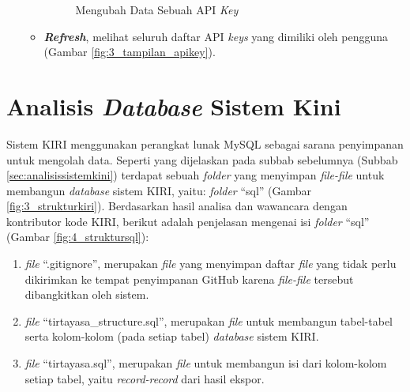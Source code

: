 \begin{enumerate}
\begin{itemize}
\begin{figure}[htbp]
			\caption{Mengubah Data Sebuah API \textit{Key}}
			\label{fig:3_tampilan_editapikey}
		\end{figure}
		\item \textbf{\textit{Refresh}}, melihat seluruh daftar API \textit{keys} yang dimiliki oleh pengguna (Gambar \ref{fig:3_tampilan_apikey}).
	\end{itemize}
	
\end{enumerate}


\section{Analisis \textit{Database} Sistem Kini}
\label{sec:analisisdatabasesistemkini}
Sistem KIRI menggunakan perangkat lunak MySQL sebagai sarana penyimpanan untuk mengolah data. Seperti yang dijelaskan pada subbab sebelumnya (Subbab \ref{sec:analisissistemkini}) terdapat sebuah \textit{folder} yang menyimpan \textit{file-file} untuk membangun \textit{database} sistem KIRI, yaitu: \textit{folder} ``sql'' (Gambar \ref{fig:3_strukturkiri}). Berdasarkan hasil analisa dan wawancara dengan kontributor kode KIRI, berikut adalah penjelasan mengenai isi \textit{folder} ``sql'' (Gambar \ref{fig:4_struktursql}):
\begin{enumerate}
	\item \textit{file} ``.gitignore'', merupakan \textit{file} yang menyimpan daftar \textit{file} yang tidak perlu dikirimkan ke tempat penyimpanan GitHub karena \textit{file-file} tersebut dibangkitkan oleh sistem.
	\item \textit{file} ``tirtayasa\_structure.sql'', merupakan \textit{file} untuk membangun tabel-tabel serta kolom-kolom (pada setiap tabel) \textit{database} sistem KIRI.
	\item \textit{file} ``tirtayasa.sql'', merupakan \textit{file} untuk membangun isi dari kolom-kolom setiap tabel, yaitu \textit{record-record} dari hasil ekspor.
\end{enumerate}

